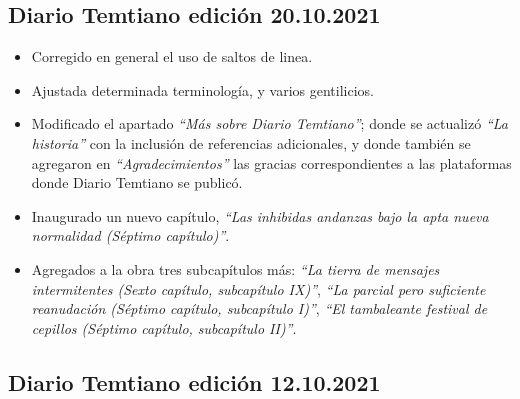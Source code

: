 \documentclass[
]{book}
\begin{document}
\hypertarget{diario-temtiano-ediciuxf3n-20.10.2021}{%
\subsection*{Diario Temtiano edición 20.10.2021}\label{diario-temtiano-ediciuxf3n-20.10.2021}}

\begin{itemize}
\item
  Corregido en general el uso de saltos de linea.
\item
  Ajustada determinada terminología, y varios gentilicios.
\item
  Modificado el apartado \emph{``Más sobre Diario Temtiano''}; donde se actualizó \emph{``La historia''} con la inclusión de referencias adicionales, y donde también se agregaron en \emph{``Agradecimientos''} las gracias correspondientes a las plataformas donde Diario Temtiano se publicó.
\item
  Inaugurado un nuevo capítulo, \emph{``Las inhibidas andanzas bajo la apta nueva normalidad (Séptimo capítulo)''}.
\item
  Agregados a la obra tres subcapítulos más: \emph{``La tierra de mensajes intermitentes (Sexto capítulo, subcapítulo IX)''}, \emph{``La parcial pero suficiente reanudación (Séptimo capítulo, subcapítulo I)''}, \emph{``El tambaleante festival de cepillos (Séptimo capítulo, subcapítulo II)''}.
\end{itemize}

\hypertarget{diario-temtiano-ediciuxf3n-12.10.2021}{%
\subsection*{Diario Temtiano edición 12.10.2021}\label{diario-temtiano-ediciuxf3n-12.10.2021}}
\end{document}
